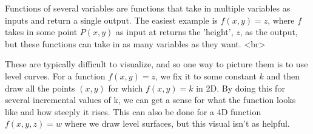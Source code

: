 Functions of several variables are functions that take in multiple variables as inputs and return a single output. The easiest example is $f(x, y) = z$, where $f$ takes in some point $P(x, y)$ as input at returns the 'height', $z$, as the output, but these functions can take in as many variables as they want. <br>

These are typically difficult to visualize, and so one way to picture them is to use level curves. For a function $f(x, y) = z$, we fix it to some constant $k$ and then draw all the points $(x, y)$ for which $f(x, y) = k$ in 2D. By doing this for several incremental values of k, we can get a sense for what the function looks like and how steeply it rises. This can also be done for a 4D function $f(x, y, z) = w$ where we draw level surfaces, but this visual isn't as helpful.
